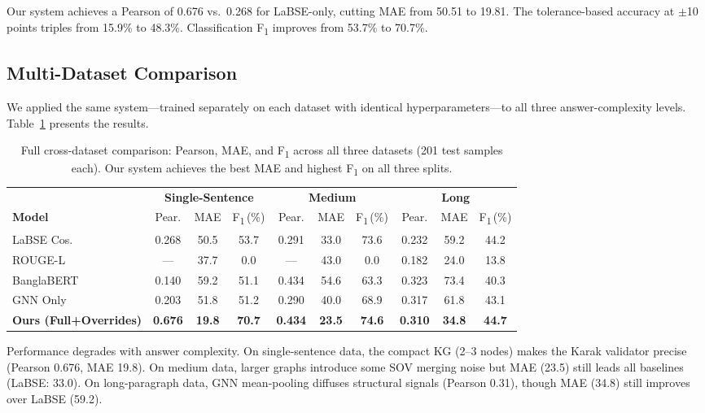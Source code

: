 \documentclass[11pt]{article}
\begin{document}
Our system achieves a Pearson of 0.676 vs.\ 0.268 for LaBSE-only, cutting MAE from 50.51 to 19.81. The tolerance-based accuracy at $\pm$10 points triples from 15.9\% to 48.3\%. Classification F\textsubscript{1} improves from 53.7\% to 70.7\%.

\subsection{Multi-Dataset Comparison}

We applied the same system---trained separately on each dataset with identical hyperparameters---to all three answer-complexity levels. Table~\ref{tab:results_all} presents the results.

\begin{table}[t]
  \centering
  \footnotesize
  \setlength{\tabcolsep}{5pt}
  \begin{tabular}{lccccccccc}
    \toprule
    & \multicolumn{3}{c}{\textbf{Single-Sentence}} & \multicolumn{3}{c}{\textbf{Medium}} & \multicolumn{3}{c}{\textbf{Long}} \\
    \cmidrule(lr){2-4}\cmidrule(lr){5-7}\cmidrule(lr){8-10}
    \textbf{Model} & Pear. & MAE & F\textsubscript{1}\,(\%) & Pear. & MAE & F\textsubscript{1}\,(\%) & Pear. & MAE & F\textsubscript{1}\,(\%) \\
    \midrule
    LaBSE Cos.    & 0.268 & 50.5 & 53.7 & 0.291 & 33.0 & 73.6 & 0.232 & 59.2 & 44.2 \\
    ROUGE-L       & ---   & 37.7 &  0.0 & ---   & 43.0 &  0.0 & 0.182 & 24.0 & 13.8 \\
    BanglaBERT    & 0.140 & 59.2 & 51.1 & 0.434 & 54.6 & 63.3 & 0.323 & 73.4 & 40.3 \\
    GNN Only      & 0.203 & 51.8 & 51.2 & 0.290 & 40.0 & 68.9 & 0.317 & 61.8 & 43.1 \\
    \textbf{Ours (Full+Overrides)} & \textbf{0.676} & \textbf{19.8} & \textbf{70.7} & \textbf{0.434} & \textbf{23.5} & \textbf{74.6} & \textbf{0.310} & \textbf{34.8} & \textbf{44.7} \\
    \bottomrule
  \end{tabular}
  \caption{Full cross-dataset comparison: Pearson, MAE, and F\textsubscript{1} across all three datasets (201 test samples each). Our system achieves the best MAE and highest F\textsubscript{1} on all three splits.}
  \label{tab:results_all}
\end{table}

Performance degrades with answer complexity. On single-sentence data, the compact KG (2--3 nodes) makes the Karak validator precise (Pearson 0.676, MAE 19.8). On medium data, larger graphs introduce some SOV merging noise but MAE (23.5) still leads all baselines (LaBSE: 33.0). On long-paragraph data, GNN mean-pooling diffuses structural signals (Pearson 0.31), though MAE (34.8) still improves over LaBSE (59.2).
\end{document}
